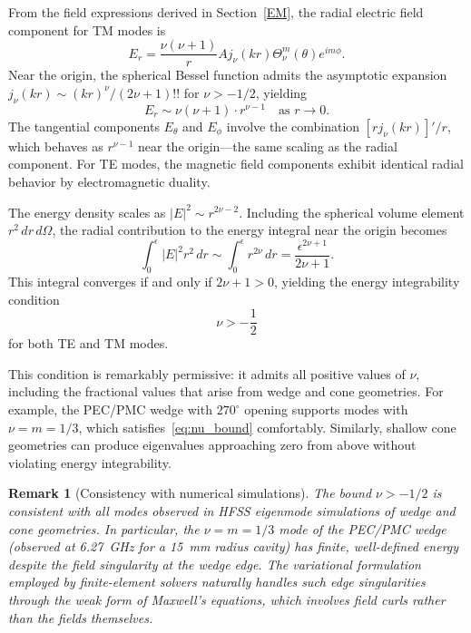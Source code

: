 \documentclass[
  aip,
  amsmath,amssymb,
  preprint
]{revtex4-1}
\newtheorem{remark}{Remark}[section]
\begin{document}
From the field expressions derived in Section~\ref{EM}, the radial electric field component for TM modes is
\begin{equation}
E_r = \frac{\nu(\nu+1)}{r} A j_\nu(kr) \Theta_\nu^m(\theta) e^{im\phi}.
\label{eq:Er_near_origin}
\end{equation}
Near the origin, the spherical Bessel function admits the asymptotic expansion $j_\nu(kr) \sim (kr)^\nu/(2\nu+1)!!$ for $\nu > -1/2$, yielding
\begin{equation}
E_r \sim \nu(\nu+1) \cdot r^{\nu-1} \quad \text{as } r \to 0.
\label{eq:Er_scaling}
\end{equation}
The tangential components $E_\theta$ and $E_\phi$ involve the combination $[rj_\nu(kr)]'/r$, which behaves as $r^{\nu-1}$ near the origin---the same scaling as the radial component. For TE modes, the magnetic field components exhibit identical radial behavior by electromagnetic duality.

The energy density scales as $|E|^2 \sim r^{2\nu-2}$. Including the spherical volume element $r^2\,dr\,d\Omega$, the radial contribution to the energy integral near the origin becomes
\begin{equation}
\int_0^\epsilon |E|^2 r^2 \, dr \sim \int_0^\epsilon r^{2\nu} \, dr 
= \frac{\epsilon^{2\nu+1}}{2\nu+1}.
\label{eq:radial_energy_integral}
\end{equation}
This integral converges if and only if $2\nu + 1 > 0$, yielding the energy integrability condition
\begin{equation}
\boxed{\nu > -\frac{1}{2}}
\label{eq:nu_bound}
\end{equation}
for both TE and TM modes.

This condition is remarkably permissive: it admits all positive values of $\nu$,
including the fractional values that arise from wedge and cone geometries. For example,
the PEC/PMC wedge with $270^\circ$ opening supports modes with $\nu = m = 1/3$, which
satisfies~\eqref{eq:nu_bound} comfortably. Similarly, shallow cone geometries can produce
eigenvalues approaching zero from above without violating energy integrability.

\begin{remark}[Consistency with numerical simulations]
The bound $\nu > -1/2$ is consistent with all modes observed in HFSS eigenmode simulations of wedge and cone geometries. In particular, the $\nu = m = 1/3$ mode of the PEC/PMC wedge (observed at 6.27~GHz for a 15~mm radius cavity) has finite, well-defined energy despite the field singularity at the wedge edge. The variational formulation employed by finite-element solvers naturally handles such edge singularities through the weak form of Maxwell's equations, which involves field curls rather than the fields themselves.
\end{remark}
\end{document}
